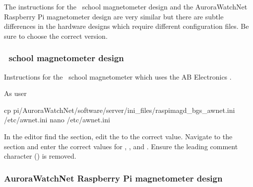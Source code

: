 The instructions for the \bgs\ school magnetometer design and the
AuroraWatchNet Raspberry Pi magnetometer design are very similar but
there are subtle differences in the hardware designs which require
different configuration files. Be sure to choose the correct version.

\subsubsection[BGS school magnetometer design]{\protect\bgs\ school
  magnetometer design}

Instructions for the \bgs\ school magnetometer which uses the AB
Electronics \adc.

As user \rootUser
\begin{Cmd}[fontsize=\relsize{-1.75}]
  cp \mytilde{}pi/AuroraWatchNet/software/server/ini_files/raspimagd_bgs_awnet.ini  /etc/awnet.ini
  nano /etc/awnet.ini
\end{Cmd}

In the editor find the \code{[DEFAULT]} section, edit the 
to the correct value. Navigate to the \code{[upload]} section and
enter the correct values for , ,
 and . Ensure the leading comment character
(\code{\#}) is removed. 

\subsubsection{AuroraWatchNet Raspberry Pi magnetometer design}

